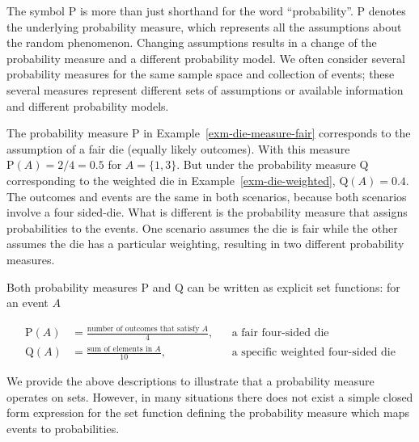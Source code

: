 \documentclass[
  letterpaper,
  DIV=11,
  numbers=noendperiod]{scrreprt}
\theoremstyle{plain}
\theoremstyle{definition}
\theoremstyle{definition}
\theoremstyle{definition}
\theoremstyle{remark}
\begin{document}
The symbol \(\textrm{P}\) is more than just shorthand for the word
``probability''. \(\textrm{P}\) denotes the underlying probability
measure, which represents all the assumptions about the random
phenomenon. Changing assumptions results in a change of the probability
measure and a different probability model. We often consider several
probability measures for the same sample space and collection of events;
these several measures represent different sets of assumptions or
available information and different probability models.

The probability measure \(\textrm{P}\) in
Example~\ref{exm-die-measure-fair} corresponds to the assumption of a
fair die (equally likely outcomes). With this measure
\(\textrm{P}(A) = 2/4=0.5\) for \(A = \{1, 3\}\). But under the
probability measure \(\textrm{Q}\) corresponding to the weighted die in
Example~\ref{exm-die-weighted}, \(\textrm{Q}(A) = 0.4\). The outcomes
and events are the same in both scenarios, because both scenarios
involve a four sided-die. What is different is the probability measure
that assigns probabilities to the events. One scenario assumes the die
is fair while the other assumes the die has a particular weighting,
resulting in two different probability measures.

Both probability measures \(\textrm{P}\) and \(\textrm{Q}\) can be
written as explicit set functions: for an event \(A\)

\begin{align*}
\textrm{P}(A) & = \frac{\text{number of outcomes that satisfy $A$}}{4}, & & {\text{a fair four-sided die}}
\\
\textrm{Q}(A) & = \frac{\text{sum of elements in $A$}}{10}, & & {\text{a specific weighted four-sided die}}
\end{align*}

We provide the above descriptions to illustrate that a probability
measure operates on sets. However, in many situations there does not
exist a simple closed form expression for the set function defining the
probability measure which maps events to probabilities.
\end{document}
